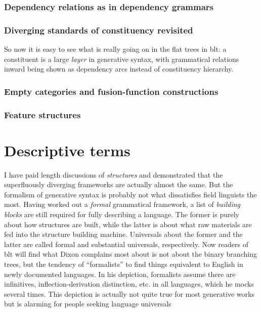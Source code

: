\documentclass[../main.tex]{subfiles}
\begin{document}
\subsubsection{Dependency relations as in dependency grammars}\label{sec:dependency}



\subsubsection{Diverging standards of constituency revisited}

So now it is easy to see what is really going on in the flat trees in \ac{blt}: a constituent
is a large \emph{layer} in generative syntax, with grammatical relations inward being shown as 
dependency arcs instead of constituency hierarchy. 

\subsubsection{Empty categories and fusion-function constructions}

\subsubsection{Feature structures}


\section{Descriptive terms}

I have paid length discussions of \emph{structures} and demonstrated that the superfluously diverging 
frameworks are actually almost the same. But the formalism of generative syntax is probably not 
what dissatisfies field linguists the most.
Having worked out a \emph{formal} grammatical framework, a list of \emph{building blocks} 
are still required for fully describing a language. The former is purely about 
how structures are built, while the latter is about what raw materials are fed into the structure 
building machine. Universals about the former and the latter are called formal and substantial universals,
respectively. Now readers of \ac{blt} will find what Dixon complains most about is not about the 
binary branching trees, but the tendency of ``formalists'' to find things equivalent to English 
in newly documented languages. In his depiction, formalists assume there are infinitives, 
inflection-derivation distinction, etc. in all languages, which he mocks several times. 
This depiction is actually not quite true for most generative works but is 
alarming for people seeking language universals %
\end{document}
